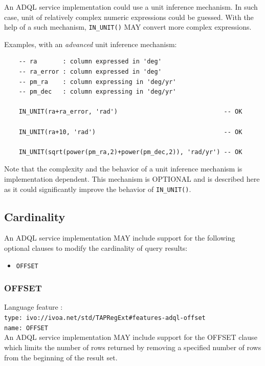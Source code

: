 \documentclass[11pt,a4paper]{ivoa}
\begin{document}
An ADQL service implementation could use a unit inference mechanism. In such
case, unit of relatively complex numeric expressions could be guessed. With the
help of a such mechanism, \verb:IN_UNIT(): MAY convert more complex
expressions.

Examples, with an \emph{advanced} unit inference mechanism:

\begin{verbatim}
    -- ra       : column expressed in 'deg'
    -- ra_error : column expressed in 'deg'
    -- pm_ra    : column expressing in 'deg/yr'
    -- pm_dec   : column expressing in 'deg/yr'

    IN_UNIT(ra+ra_error, 'rad')                             -- OK

    IN_UNIT(ra+10, 'rad')                                   -- OK

    IN_UNIT(sqrt(power(pm_ra,2)+power(pm_dec,2)), 'rad/yr') -- OK
\end{verbatim}

Note that the complexity and the behavior of a unit inference mechanism is
implementation dependent. This mechanism is OPTIONAL and is described here
as it could significantly improve the behavior of \verb:IN_UNIT():.

\subsection{Cardinality}
\label{sec:cardinality}

An ADQL service implementation MAY include support for the following optional
clauses to modify the cardinality of query results:

\begin{itemize}
    \item \verb:OFFSET:
\end{itemize}

\subsubsection{OFFSET}
\label{sec:offset}

{\footnotesize Language feature :}\\
{\footnotesize \verb|type: ivo://ivoa.net/std/TAPRegExt#features-adql-offset|}\\
{\footnotesize \verb|name: OFFSET|}\\

An ADQL service implementation MAY include support for the OFFSET clause
which limits the number of rows returned by removing a specified number
of rows from the beginning of the result set.
\end{document}
